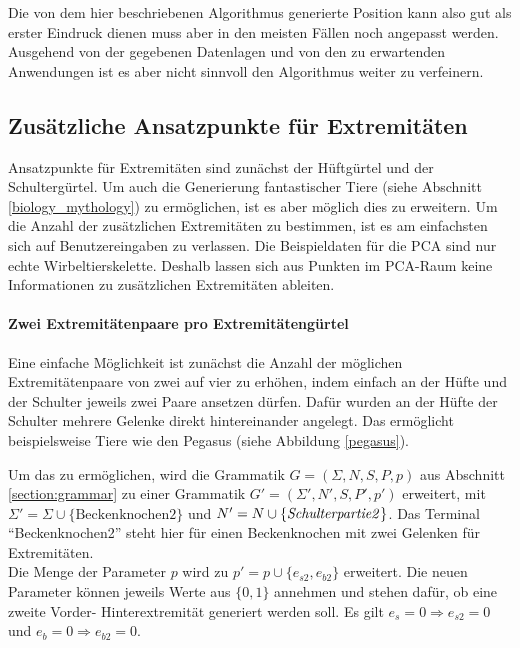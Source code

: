 Die von dem hier beschriebenen Algorithmus generierte Position kann also gut als erster Eindruck dienen muss aber in den meisten Fällen noch angepasst werden. Ausgehend von der gegebenen Datenlagen und von den zu erwartenden Anwendungen ist es aber nicht sinnvoll den Algorithmus weiter zu verfeinern.

\subsection{Zusätzliche Ansatzpunkte für Extremitäten}
\label{additional_extremities}

Ansatzpunkte für Extremitäten sind zunächst der Hüftgürtel und der Schultergürtel. Um auch die Generierung fantastischer Tiere (siehe Abschnitt \ref{biology_mythology}) zu ermöglichen, ist es aber möglich dies zu erweitern. Um die Anzahl der zusätzlichen Extremitäten zu bestimmen, ist es am einfachsten sich auf Benutzereingaben zu verlassen. Die Beispieldaten für die PCA sind nur echte Wirbeltierskelette. Deshalb lassen sich aus Punkten im PCA-Raum keine Informationen zu zusätzlichen Extremitäten ableiten.

\paragraph{Zwei Extremitätenpaare pro Extremitätengürtel}
Eine einfache Möglichkeit ist zunächst die Anzahl der möglichen Extremitätenpaare von zwei auf vier zu erhöhen, indem einfach an der Hüfte und der Schulter jeweils zwei Paare ansetzen dürfen. Dafür wurden an der Hüfte \bzw der Schulter mehrere Gelenke direkt hintereinander angelegt. Das ermöglicht beispielsweise Tiere wie den Pegasus (siehe Abbildung \ref{pegasus}).

Um das zu ermöglichen, wird die Grammatik $G = (\Sigma, N, S, P, p)$ aus Abschnitt \ref{section:grammar} zu einer Grammatik $G' = (\Sigma', N', S, P', p')$ erweitert, mit $\Sigma' = \Sigma \cup \{\text{Beckenknochen2}\}$ und \mbox{$N' = N \cup \{\text{\emph{Schulterpartie2}}\}$}. Das Terminal "`Beckenknochen2"' steht hier für einen Beckenknochen mit zwei Gelenken für Extremitäten.\\
Die Menge der Parameter $p$ wird zu $p' = p \cup \{ e_{s2}, e_{b2} \}$ erweitert. Die neuen Parameter können jeweils Werte aus $\{0,1\}$ annehmen und stehen dafür, ob eine zweite Vorder- \bzw Hinterextremität generiert werden soll. Es gilt $e_s = 0 \Rightarrow e_{s2} = 0$ und $e_b = 0 \Rightarrow e_{b2} = 0$.

